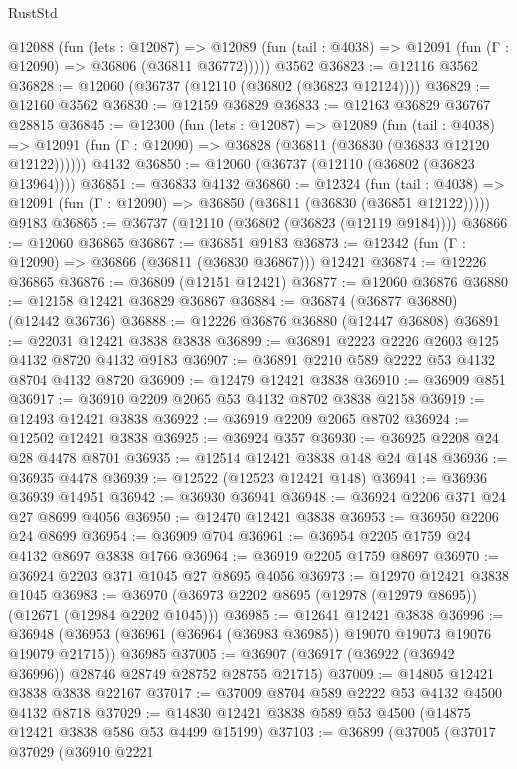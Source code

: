 \begin{lexlean}{RustStd}
\begin{coremodule}
    @12088
      (fun (lets : @12087) =>
      @12089 (fun (tail : @4038) => @12091 (fun (Γ : @12090) => @36806 (@36811 @36772)))))
    @3562
@36823 := @12116 @3562
@36828 := @12060 (@36737 (@12110 (@36802 (@36823 @12124))))
@36829 := @12160 @3562
@36830 := @12159 @36829
@36833 := @12163 @36829 @36767 @28815
@36845 := @12300
    (fun (lets : @12087) =>
    @12089
      (fun (tail : @4038) =>
      @12091 (fun (Γ : @12090) => @36828 (@36811 (@36830 (@36833 @12120 @12122))))))
    @4132
@36850 := @12060 (@36737 (@12110 (@36802 (@36823 @13964))))
@36851 := @36833 @4132
@36860 := @12324
    (fun (tail : @4038) => @12091 (fun (Γ : @12090) => @36850 (@36811 (@36830 (@36851 @12122)))))
    @9183
@36865 := @36737 (@12110 (@36802 (@36823 (@12119 @9184))))
@36866 := @12060 @36865
@36867 := @36851 @9183
@36873 := @12342 (fun (Γ : @12090) => @36866 (@36811 (@36830 @36867))) @12421
@36874 := @12226 @36865
@36876 := @36809 (@12151 @12421)
@36877 := @12060 @36876
@36880 := @12158 @12421 @36829 @36867
@36884 := @36874 (@36877 @36880) (@12442 @36736)
@36888 := @12226 @36876 @36880 (@12447 @36808)
@36891 := @22031 @12421 @3838 @3838
@36899 := @36891 @2223 @2226 @2603 @125 @4132 @8720 @4132 @9183
@36907 := @36891 @2210 @589 @2222 @53 @4132 @8704 @4132 @8720
@36909 := @12479 @12421 @3838
@36910 := @36909 @851
@36917 := @36910 @2209 @2065 @53 @4132 @8702 @3838 @2158
@36919 := @12493 @12421 @3838
@36922 := @36919 @2209 @2065 @8702
@36924 := @12502 @12421 @3838
@36925 := @36924 @357
@36930 := @36925 @2208 @24 @28 @4478 @8701
@36935 := @12514 @12421 @3838 @148 @24 @148
@36936 := @36935 @4478
@36939 := @12522 (@12523 @12421 @148)
@36941 := @36936 @36939 @14951
@36942 := @36930 @36941
@36948 := @36924 @2206 @371 @24 @27 @8699 @4056
@36950 := @12470 @12421 @3838
@36953 := @36950 @2206 @24 @8699
@36954 := @36909 @704
@36961 := @36954 @2205 @1759 @24 @4132 @8697 @3838 @1766
@36964 := @36919 @2205 @1759 @8697
@36970 := @36924 @2203 @371 @1045 @27 @8695 @4056
@36973 := @12970 @12421 @3838 @1045
@36983 := @36970 (@36973 @2202 @8695 (@12978 (@12979 @8695)) (@12671 (@12984 @2202 @1045)))
@36985 := @12641 @12421 @3838
@36996 := @36948
    (@36953 (@36961 (@36964 (@36983 @36985)) @19070 @19073 @19076 @19079 @21715))
    @36985
@37005 := @36907 (@36917 (@36922 (@36942 @36996)) @28746 @28749 @28752 @28755 @21715)
@37009 := @14805 @12421 @3838 @3838 @22167
@37017 := @37009 @8704 @589 @2222 @53 @4132 @4500 @4132 @8718
@37029 := @14830 @12421 @3838 @589 @53 @4500 (@14875 @12421 @3838 @586 @53 @4499 @15199)
@37103 := @36899
    (@37005
      (@37017
        @37029
        (@36910
          @2221

\end{coremodule}
\end{lexlean}
